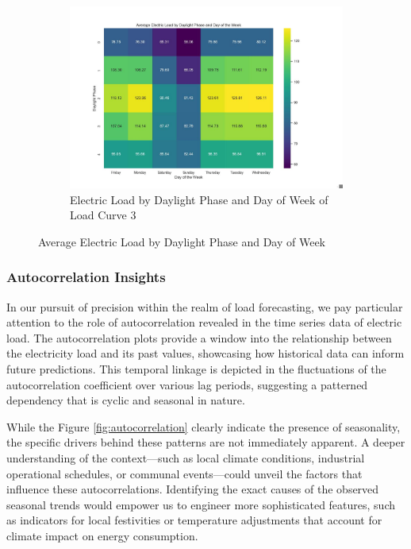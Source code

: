 \documentclass{article} %
\begin{document}
\begin{figure}[H]
\begin{subfigure}[b]{0.7\textwidth}
        \centering
        \includegraphics[width=\textwidth]{ressources/Daylight_Week/ElectricLoadDaylight(3).jpg}
        \caption{Electric Load by Daylight Phase and Day of Week of Load Curve 3}
        \label{fig:Daylight3}
    \end{subfigure}
    \caption{Average Electric Load by Daylight Phase and Day of Week}
    \label{fig:Daylight}
\end{figure}



\subsubsection{Autocorrelation Insights}
In our pursuit of precision within the realm of load forecasting, we pay particular attention to the role of autocorrelation revealed in the time series data of electric load. The autocorrelation plots provide a window into the relationship between the electricity load and its past values, showcasing how historical data can inform future predictions. This temporal linkage is depicted in the fluctuations of the autocorrelation coefficient over various lag periods, suggesting a patterned dependency that is cyclic and seasonal in nature. 

While the Figure \ref{fig:autocorrelation} clearly indicate the presence of seasonality, the specific drivers behind these patterns are not immediately apparent. A deeper understanding of the context—such as local climate conditions, industrial operational schedules, or communal events—could unveil the factors that influence these autocorrelations. Identifying the exact causes of the observed seasonal trends would empower us to engineer more sophisticated features, such as indicators for local festivities or temperature adjustments that account for climate impact on energy consumption. 
\end{document}
